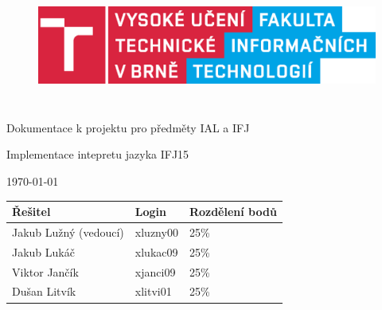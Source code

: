 \begin{titlepage}

\begin{figure}[!h]
  \centering
  \includegraphics[height=4cm]{img/FIT_barevne_PANTONE_CZ.eps}
\end{figure}

\vfill

\begin{center}
\begin{Large}
Dokumentace k projektu pro předměty IAL a IFJ\\
\end{Large}
\bigskip
\begin{Huge}
Implementace intepretu jazyka IFJ15
\end{Huge}

\end{center}

\vfill

\begin{center}
\begin{Large}
\today
\end{Large}
\end{center}

\vfill

\begin{flushleft}
\begin{large}
\begin{tabular}{ l l l }
Řešitel              & Login & Rozdělení bodů \\
\hline
Jakub Lužný (vedoucí) & xluzny00 & 25\% \\
Jakub Lukáč & xlukac09 & 25\% \\
Viktor Jančík & xjanci09 & 25\% \\
Dušan Litvík & xlitvi01 & 25\% \\
\end{tabular}
\end{large}
\end{flushleft}
\end{titlepage}
